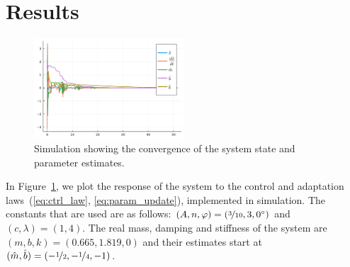 \section{Results}
\label{sec:results}

\begin{figure}[b]
  \centering
  \includegraphics[width=0.5\textwidth]{./figures/adaptationrule2.pdf}
  \caption{Simulation showing the convergence of the system state and parameter
  estimates.}
  \label{fig:adaptation}
\end{figure}

In Figure~\ref{fig:adaptation}, we plot the response of the system to the
control and adaptation laws~(\ref{eq:ctrl_law}, \ref{eq:param_update}),
implemented in simulation. The constants that are used are as follows: $(A, n,
\varphi) = (\nicefrac{3}{10}, 3, 0^\circ)$ and $(c, \lambda) = (1, 4)$. The real
mass, damping and stiffness of the system are $(m, b, k) = (0.665, 1.819, 0)$
and their estimates start at $(\hat{m}, \hat{b}) = (-\nicefrac{1}{2},
-\nicefrac{1}{4}, -1)$.
